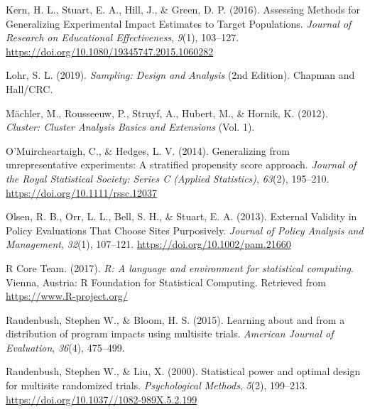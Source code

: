 \documentclass[
  english,
  man,floatsintext]{apa6}
\newlength{\cslhangindent}
\newlength{\cslentryspacingunit} %
\newenvironment{CSLReferences}[2] %
 {%
  \setlength{\parindent}{0pt}
  \ifodd #1
  \let\oldpar\par
  \def\par{\hangindent=\cslhangindent\oldpar}
  \fi
  \setlength{\parskip}{#2\cslentryspacingunit}
 }%
 {}
\begin{document}
\begin{CSLReferences}{1}{0}
\leavevmode{}%
Kern, H. L., Stuart, E. A., Hill, J., \& Green, D. P. (2016). Assessing {Methods} for {Generalizing Experimental Impact Estimates} to {Target Populations}. \emph{Journal of Research on Educational Effectiveness}, \emph{9}(1), 103--127. \url{https://doi.org/10.1080/19345747.2015.1060282}

\leavevmode{}%
Lohr, S. L. (2019). \emph{Sampling: {Design} and {Analysis}} (2nd Edition). {Chapman and Hall/CRC}.

\leavevmode{}%
Mächler, M., Rousseeuw, P., Struyf, A., Hubert, M., \& Hornik, K. (2012). \emph{Cluster: {Cluster Analysis Basics} and {Extensions}} (Vol. 1).

\leavevmode{}%
O'Muircheartaigh, C., \& Hedges, L. V. (2014). Generalizing from unrepresentative experiments: A stratified propensity score approach. \emph{Journal of the Royal Statistical Society: Series C (Applied Statistics)}, \emph{63}(2), 195--210. \url{https://doi.org/10.1111/rssc.12037}

\leavevmode{}%
Olsen, R. B., Orr, L. L., Bell, S. H., \& Stuart, E. A. (2013). External {Validity} in {Policy Evaluations That Choose Sites Purposively}. \emph{Journal of Policy Analysis and Management}, \emph{32}(1), 107--121. \url{https://doi.org/10.1002/pam.21660}

\leavevmode{}%
R Core Team. (2017). \emph{R: A language and environment for statistical computing}. Vienna, Austria: R Foundation for Statistical Computing. Retrieved from \url{https://www.R-project.org/}

\leavevmode{}%
Raudenbush, Stephen W., \& Bloom, H. S. (2015). Learning about and from a distribution of program impacts using multisite trials. \emph{American Journal of Evaluation}, \emph{36}(4), 475--499.

\leavevmode{}%
Raudenbush, Stephen W., \& Liu, X. (2000). Statistical power and optimal design for multisite randomized trials. \emph{Psychological Methods}, \emph{5}(2), 199--213. \url{https://doi.org/10.1037//1082-989X.5.2.199}


\end{CSLReferences}
\end{document}
